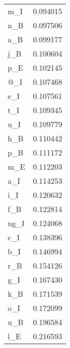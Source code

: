 \begin{tabular}{lr}
m\_I  &  0.094015 \\
n\_B  &  0.097506 \\
a\_B  &  0.099177 \\
j\_B  &  0.100604 \\
p\_E  &  0.102145 \\
@\_I  &  0.107468 \\
e\_I  &  0.107561 \\
t\_I  &  0.109345 \\
u\_I  &  0.109779 \\
h\_B  &  0.110442 \\
p\_B  &  0.111172 \\
m\_E  &  0.112203 \\
a\_I  &  0.114253 \\
i\_I  &  0.120632 \\
f\_B  &  0.122814 \\
ng\_I &  0.124068 \\
c\_I  &  0.138396 \\
b\_I  &  0.146994 \\
r\_B  &  0.154126 \\
g\_I  &  0.167430 \\
k\_B  &  0.171539 \\
o\_I  &  0.172099 \\
u\_B  &  0.196584 \\
l\_E  &  0.216593 \\
\bottomrule
\end{tabular}
